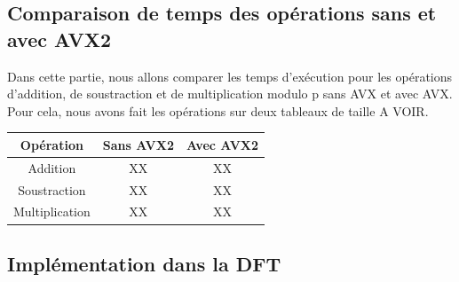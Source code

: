 \documentclass[12pt, a4paper]{article}
\begin{document}
\subsection{Comparaison de temps des opérations sans et avec AVX2}

Dans cette partie, nous allons comparer les temps d'exécution pour les opérations d'addition, de soustraction et de multiplication modulo p sans AVX et avec AVX. Pour cela, nous avons fait les opérations sur deux tableaux de taille A VOIR.

\begin{center}
\begin{tabular}{||c c c||}
\hline
Opération & Sans AVX2 & Avec AVX2 \\
\hline\hline
Addition & XX & XX \\
\hline
Soustraction & XX & XX \\
\hline
Multiplication & XX & XX \\
\hline
\end{tabular}
\end{center}

\subsection{Implémentation dans la DFT}
\end{document}
